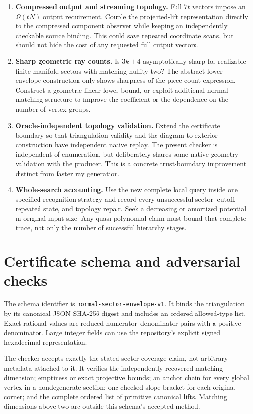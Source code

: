 \documentclass[11pt]{article}
\theoremstyle{definition}
\theoremstyle{remark}
\begin{document}
\begin{enumerate}[label=\textbf{\arabic*.},leftmargin=*]
\item \textbf{Compressed output and streaming topology.}
Full $7t$ vectors impose an $\Omega(tN)$ output requirement. Couple the
projected-lift representation directly to the compressed component observer
while keeping an independently checkable source binding. This could save
repeated coordinate scans, but should not hide the cost of any requested
full output vectors.

\item \textbf{Sharp geometric ray counts.}
Is $3k+4$ asymptotically sharp for realizable finite-manifold sectors with
matching nullity two? The abstract lower-envelope construction only shows
sharpness of the piece-count expression. Construct a geometric linear lower
bound, or exploit additional normal-matching structure to improve the
coefficient or the dependence on the number of vertex groups.

\item \textbf{Oracle-independent topology validation.}
Extend the certificate boundary so that triangulation validity and the
diagram-to-exterior construction have independent native replay. The present
checker is independent of enumeration, but deliberately shares some native
geometry validation with the producer. This is a concrete trust-boundary
improvement distinct from faster ray generation.

\item \textbf{Whole-search accounting.}
Use the new complete local query inside one specified recognition strategy
and record every unsuccessful sector, cutoff, repeated state, and topology
repair. Seek a decreasing or amortized potential in original-input size.
Any quasi-polynomial claim must bound that complete trace, not only the
number of successful hierarchy stages.
\end{enumerate}

\appendix
\section{Certificate schema and adversarial checks}
\label{app:schema}

The schema identifier is \texttt{normal-sector-envelope-v1}. It binds the
triangulation by its canonical JSON SHA-256 digest and includes an ordered
allowed-type list. Exact rational values are reduced numerator--denominator
pairs with a positive denominator. Large integer fields can use the
repository's explicit signed hexadecimal representation.

The checker accepts exactly the stated sector coverage claim, not arbitrary
metadata attached to it. It verifies the independently recovered matching
dimension; emptiness or exact projective bounds; an anchor chain for every
global vertex in a nondegenerate section; one checked slope bracket for each
original corner; and the complete ordered list of primitive canonical lifts.
Matching dimensions above two are outside this schema's accepted method.
\end{document}
